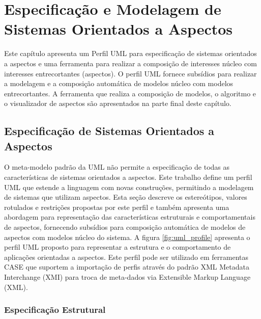 \chapter{Especificação e Modelagem de Sistemas Orientados a Aspectos}

Este capítulo apresenta um Perfil UML para especificação de sistemas orientados a aspectos e uma ferramenta para realizar a composição de interesses
núcleo com interesses entrecortantes (aspectos). O perfil UML fornece subsídios para realizar a modelagem e a composição automática de modelos núcleo
com modelos entrecortantes. A ferramenta que realiza a composição de modelos, o algoritmo e o visualizador de aspectos são apresentados na parte
final deste capítulo.

\section{Especificação de Sistemas Orientados a Aspectos}

O meta-modelo padrão da UML não permite a especificação de todas as características de sistemas orientados a aspectos. Este trabalho define um perfil
UML que estende a linguagem com novas construções, permitindo a modelagem de sistemas que utilizam aspectos. Esta seção descreve os
estereótipos, valores rotulados e restrições propostas por este perfil e também apresenta uma abordagem para representação das características estruturais e
comportamentais de aspectos, fornecendo subsídios para composição automática de modelos de aspectos com modelos núcleo do sistema. A figura
\ref{fig:uml_profile} apresenta o perfil UML proposto para representar a estrutura e o comportamento de aplicações orientadas a aspectos.
Este perfil pode ser utilizado em ferramentas CASE que suportem a importação de perfis através do padrão XML Metadata Interchange (XMI) \cite{xmi:11} para
troca de meta-dados via Extensible Markup Language (XML). 

\subsection{Especificação Estrutural}

